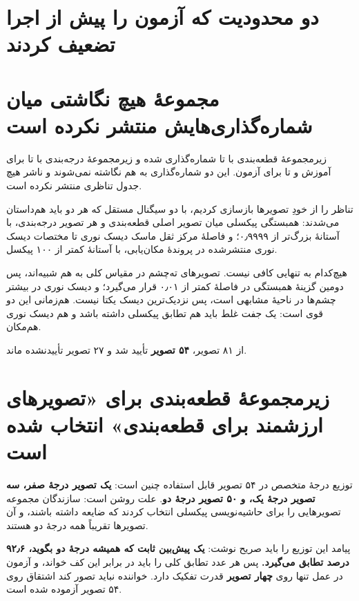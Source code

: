\section{دو محدودیت که آزمون را پیش از اجرا تضعیف کردند}

\section{مجموعهٔ  هیچ نگاشتی میان شماره‌گذاری‌هایش منتشر نکرده است}

زیرمجموعهٔ قطعه‌بندی با  تا  شماره‌گذاری شده و زیرمجموعهٔ درجه‌بندی
با  تا  برای آموزش و  تا  برای آزمون.
این دو شماره‌گذاری به هم نگاشته نمی‌شوند و ناشر هیچ جدول تناظری منتشر نکرده است.

تناظر را از خودِ تصویرها بازسازی کردیم، با دو سیگنال مستقل که هر دو باید هم‌داستان می‌شدند:
همبستگی پیکسلی میان تصویر اصلی قطعه‌بندی و هر تصویر درجه‌بندی، با آستانهٔ بزرگ‌تر از \num{۰٫۹۹۹۹}؛ و
فاصلهٔ مرکز ثقل ماسک دیسک نوری تا مختصات دیسک نوری منتشرشده در پروندهٔ مکان‌یابی، با آستانهٔ
کمتر از \num{۱۰۰} پیکسل.

هیچ‌کدام به تنهایی کافی نیست. تصویرهای ته‌چشم در مقیاس کلی به هم شبیه‌اند، پس دومین گزینهٔ
همبستگی در فاصلهٔ کمتر از \num{۰٫۰۱} قرار می‌گیرد؛ و دیسک نوری در بیشتر چشم‌ها در ناحیهٔ مشابهی است،
پس نزدیک‌ترین دیسک یکتا نیست. هم‌زمانی این دو قوی است: یک جفت غلط باید هم تطابق پیکسلی داشته
باشد و هم دیسک نوری هم‌مکان.

از \num{۸۱} تصویر، \textbf{\num{۵۴} تصویر} تأیید شد و \num{۲۷} تصویر تأییدنشده ماند.

\section{زیرمجموعهٔ قطعه‌بندی برای «تصویرهای ارزشمند برای قطعه‌بندی» انتخاب شده است}

توزیع درجهٔ متخصص در \num{۵۴} تصویر قابل استفاده چنین است: \textbf{یک تصویر درجهٔ صفر، سه تصویر
درجهٔ یک، و \num{۵۰} تصویر درجهٔ دو}. علت روشن است: سازندگان مجموعه تصویرهایی را برای حاشیه‌نویسی
پیکسلی انتخاب کردند که ضایعه داشته باشند، و آن تصویرها تقریباً همه درجهٔ دو هستند.

پیامد این توزیع را باید صریح نوشت: \textbf{یک پیش‌بین ثابت که همیشه درجهٔ دو بگوید، \num{۹۲٫۶} درصد
تطابق می‌گیرد.} پس هر عدد تطابق کلی را باید در برابر این کف خواند، و آزمون در عمل تنها روی
\textbf{چهار تصویر} قدرت تفکیک دارد. خواننده نباید تصور کند اشتقاق روی \num{۵۴} تصویر آزموده شده است.

